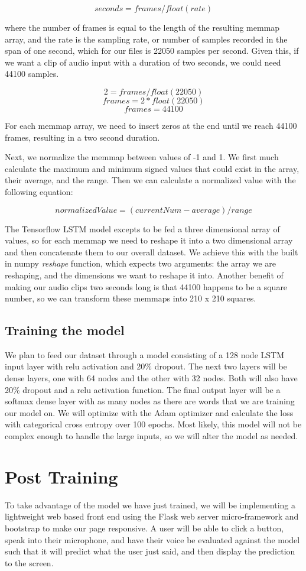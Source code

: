 \documentclass{article}
\begin{document}
\[ seconds = frames / float(rate) \]

where the number of frames is equal to the length of the resulting memmap array, and the rate is the sampling rate, or number of samples recorded in the span of one second, which for our files is 22050 samples per second. Given this, if we want a clip of audio input with a duration of two seconds, we could need 44100 samples. 

\[ 2 = frames / float(22050) \]
\[ frames = 2 * float(22050) \]
\[ frames = 44100 \]

For each memmap array, we need to insert zeros at the end until we reach 44100 frames, resulting in a two second duration. 

Next, we normalize the memmap between values of -1 and 1. We first much calculate the maximum and minimum signed values that could exist in the array, their average, and the range. Then we can calculate a normalized value with the following equation: 

\[ normalizedValue = (currentNum-average) / range \]

The Tensorflow LSTM model excepts to be fed a three dimensional array of values, so for each memmap we need to reshape it into a two dimensional array and then concatenate them to our overall dataset. We achieve this with the built in numpy \textit{reshape} function, which expects two arguments: the array we are reshaping, and the dimensions we want to reshape it into. Another benefit of making our audio clips two seconds long is that 44100 happens to be a square number, so we can transform these memmaps into 210 x 210 squares.  

\subsection{Training the model}

We plan to feed our dataset through a model consisting of a 128 node LSTM input layer with relu activation and 20\% dropout. The next two layers will be dense layers, one with 64 nodes and the other with 32 nodes. Both will also have 20\% dropout and a relu activation function. The final output layer will be a softmax dense layer with as many nodes as there are words that we are training our model on. We will optimize with the Adam optimizer and calculate the loss with categorical cross entropy over 100 epochs. Most likely, this model will not be complex enough to handle the large inputs, so we will alter the model as needed. 

\section{Post Training}

To take advantage of the model we have just trained, we will be implementing a lightweight web based front end using the Flask web server micro-framework and bootstrap to make our page responsive. A user will be able to click a button, speak into their microphone, and have their voice be evaluated against the model such that it will predict what the user just said, and then display the prediction to the screen. 
 
\end{document}
